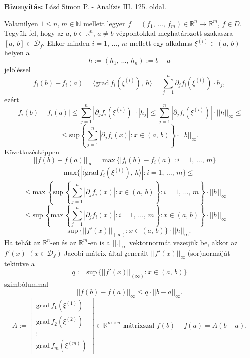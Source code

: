 \documentclass[12pt]{article}
\newcommand{\R}{\mathbb{R}}
\newcommand{\N}{\mathbb{N}}
\newcommand{\D}{\mathcal{D}_f}
\begin{document}
    \textbf{Bizonyítás:} Lásd Simon P. - Analízis III. 125. oldal.\newline

    Valamilyen $1 \leq n, \, m \in \N$ mellett legyen $f = (f_1, \, \dots, \, f_m) \in \R^n \to \R^m$, $f \in D$. Tegyük fel, hogy az $a, \, b \in \R^n$, $a \neq b$ végpontokkal meghatározott szakaszra $[a, \, b] \subset \D$. Ekkor minden $i = 1, \, \dots, \, m$ mellett egy alkalmas $\xi^{(i)} \in (a, \, b)$ helyen a
    \[
        h := (h_1, \, \dots, \, h_n) := b-a
    \]
    jelöléssel
    \[
        f_i(b)-f_i(a) = \langle \text{grad} \, f_i(\xi^{(i)}), \, h \rangle = \sum_{j=1}^n \partial_j f_i(\xi^{(i)}) \cdot h_j,
    \]
    ezért
    \[
        |f_i(b)-f_i(a)| \leq \sum_{j=1}^n |\partial_j f_i(\xi^{(i)})| \cdot |h_j| \leq \sum_{j=1}^n |\partial_j f_i(\xi^{(i)})| \cdot ||h||_\infty \leq
    \]
    \[
        \leq \text{sup} \left\{ \sum_{j=1}^n |\partial_j f_i(x)| : x \in (a, \, b)\right\} \cdot ||h||_\infty.
    \]
    Következésképpen
    \[
        ||f(b)-f(a)||_\infty = \text{max} \, \{ |f_i(b)-f_i(a)| : i = 1, \, \dots, \, m \} = 
    \]
    \[
        \text{max} \{ |\langle \text{grad} \, f_i(\xi^{(i)}), \, h \rangle| : i = 1, \, \dots, \, m\} \leq
    \]
    \[
        \leq \text{max} \, \left\{ \text{sup} \, \left\{ \sum_{j=1}^n |\partial_j f_i(x)| : x \in (a, \, b) \right\} : i = 1, \, \dots, \, m\right\} \cdot ||h||_\infty =
    \]
    \[
        \leq \text{sup} \, \left\{ \text{max} \, \left\{ \sum_{j=1}^n |\partial_j f_i(x)| : i = 1, \, \dots, \, m \right\} : x \in (a, \, b) \right\} \cdot ||h||_\infty =
    \]
    \[
        \text{sup} \, \{ ||f'(x)||_{(\infty)}  : x \in (a, \, b)\} \cdot ||h||_\infty.
    \]
    Ha tehát az $\R^n$-en és az $\R^m$-en is a $||.||_\infty$ vektornormát vezetjük be, akkor az $f'(x)$ $(x \in \D)$ Jacobi-mátrix által generált $||f'(x)||_\infty$ (sor)normáját tekintve a
    \[
        q := \text{sup} \, \{ ||f'(x)||_{(\infty)} :x \in (a, \, b) \}
    \]
    szimbólummal
    \[
        \boxed{||f(b)-f(a)||_\infty \leq q \cdot ||b-a||_\infty}.
    \]
    \[
    A :=
    \begin{bmatrix}
        \text{grad} \, f_1(\xi^{(1)}) \\
        \text{grad} \, f_2(\xi^{(2)}) \\
        \vdots \\
        \text{grad} \, f_m(\xi^{(m)})
    \end{bmatrix}
    \in \R^{m \times n} \text{ mátrixszal } f(b)- f(a) = A(b-a).
    \]

    \newpage
\end{document}
